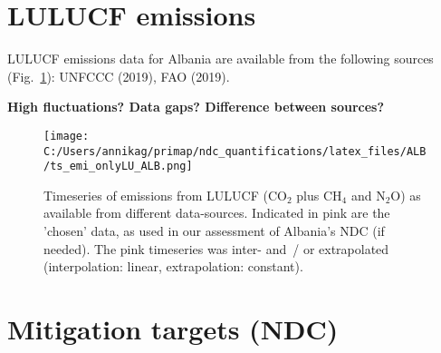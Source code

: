 \documentclass[12pt]{article}
\begin{document}
 \section{LULUCF emissions}
 \label{sec:emiLULUCF}
 LULUCF emissions data for Albania are available from the following sources (Fig.~\ref{fig:tsLULUCF}): UNFCCC (2019), FAO (2019).

 \textbf{High fluctuations? Data gaps? Difference between sources?}
 \begin{figure}[htbp]
 \centering
 \texttt{[image: C:/Users/annikag/primap/ndc\_quantifications/latex\_files/ALB/ts\_emi\_onlyLU\_ALB.png]}
 \caption{Timeseries of emissions from LULUCF (CO$_2$ plus CH$_4$ and N$_2$O) as available from different data-sources. 
 Indicated in pink are the 'chosen' data, as used in our assessment of Albania's NDC (if needed). 
 The pink timeseries was inter- and~/ or extrapolated (interpolation: linear, extrapolation: constant).}
 \label{fig:tsLULUCF}
 \end{figure}

 \section{Mitigation targets (NDC)}
 \label{sec:mitiTars}
\end{document}
